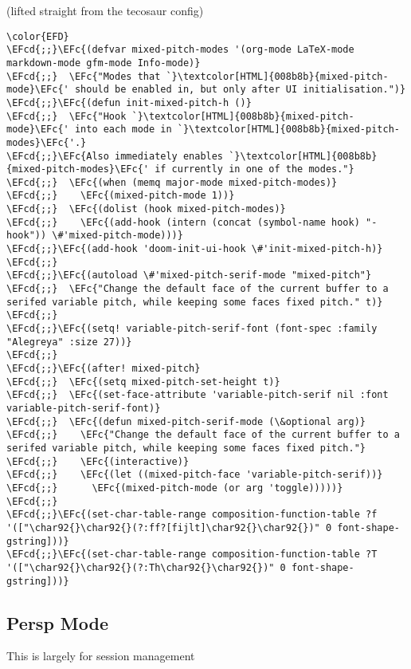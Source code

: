 \documentclass{article}
\newcommand{\EFc}[1]{\textcolor{EFc}{#1}} %
\newcommand{\EFcd}[1]{\textcolor{EFcd}{#1}} %
\begin{document}
(lifted straight from the tecosaur config)
\begin{Code}
\begin{Verbatim}
\color{EFD}
\EFcd{;;}\EFc{(defvar mixed-pitch-modes '(org-mode LaTeX-mode markdown-mode gfm-mode Info-mode)}
\EFcd{;;}  \EFc{"Modes that `}\textcolor[HTML]{008b8b}{mixed-pitch-mode}\EFc{' should be enabled in, but only after UI initialisation.")}
\EFcd{;;}\EFc{(defun init-mixed-pitch-h ()}
\EFcd{;;}  \EFc{"Hook `}\textcolor[HTML]{008b8b}{mixed-pitch-mode}\EFc{' into each mode in `}\textcolor[HTML]{008b8b}{mixed-pitch-modes}\EFc{'.}
\EFcd{;;}\EFc{Also immediately enables `}\textcolor[HTML]{008b8b}{mixed-pitch-modes}\EFc{' if currently in one of the modes."}
\EFcd{;;}  \EFc{(when (memq major-mode mixed-pitch-modes)}
\EFcd{;;}    \EFc{(mixed-pitch-mode 1))}
\EFcd{;;}  \EFc{(dolist (hook mixed-pitch-modes)}
\EFcd{;;}    \EFc{(add-hook (intern (concat (symbol-name hook) "-hook")) \#'mixed-pitch-mode)))}
\EFcd{;;}\EFc{(add-hook 'doom-init-ui-hook \#'init-mixed-pitch-h)}
\EFcd{;;}
\EFcd{;;}\EFc{(autoload \#'mixed-pitch-serif-mode "mixed-pitch"}
\EFcd{;;}  \EFc{"Change the default face of the current buffer to a serifed variable pitch, while keeping some faces fixed pitch." t)}
\EFcd{;;}
\EFcd{;;}\EFc{(setq! variable-pitch-serif-font (font-spec :family "Alegreya" :size 27))}
\EFcd{;;}
\EFcd{;;}\EFc{(after! mixed-pitch}
\EFcd{;;}  \EFc{(setq mixed-pitch-set-height t)}
\EFcd{;;}  \EFc{(set-face-attribute 'variable-pitch-serif nil :font variable-pitch-serif-font)}
\EFcd{;;}  \EFc{(defun mixed-pitch-serif-mode (\&optional arg)}
\EFcd{;;}    \EFc{"Change the default face of the current buffer to a serifed variable pitch, while keeping some faces fixed pitch."}
\EFcd{;;}    \EFc{(interactive)}
\EFcd{;;}    \EFc{(let ((mixed-pitch-face 'variable-pitch-serif))}
\EFcd{;;}      \EFc{(mixed-pitch-mode (or arg 'toggle)))))}
\EFcd{;;}
\EFcd{;;}\EFc{(set-char-table-range composition-function-table ?f '(["\char92{}\char92{}(?:ff?[fijlt]\char92{}\char92{})" 0 font-shape-gstring]))}
\EFcd{;;}\EFc{(set-char-table-range composition-function-table ?T '(["\char92{}\char92{}(?:Th\char92{}\char92{})" 0 font-shape-gstring]))}
\end{Verbatim}
\end{Code}
\subsection{Persp Mode}
\label{sec:orgc021127}
This is largely for session management
\end{document}
